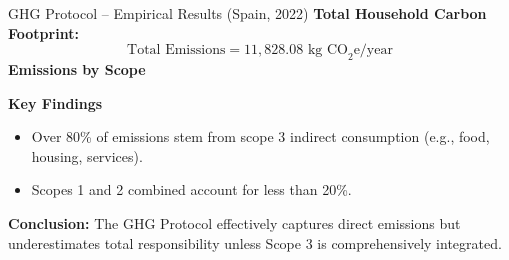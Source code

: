 \documentclass{beamer}
\begin{document}
\begin{frame}{GHG Protocol – Empirical Results (Spain, 2022)}
\vspace{-2.0em}
\footnotesize
\textbf{Total Household Carbon Footprint:}  
\[
\text{Total Emissions} = 11,828.08 \text{ kg CO}_2\text{e/year}
\]
\pause
\vspace{0.5em}
\textbf{Emissions by Scope}
\begin{table}[h!]
\small
\centering
\end{table}
\pause
\footnotesize
\textbf{Key Findings}
\begin{itemize}
  \item Over 80\% of emissions stem from scope 3 indirect consumption (e.g., food, housing, services).
  \item Scopes 1 and 2 combined account for less than 20\%.
\end{itemize}

\pause
\vspace{0.5em}
\textbf{Conclusion:}  
The GHG Protocol effectively captures direct emissions but underestimates total responsibility unless Scope 3 is comprehensively integrated.

\end{frame}
\end{document}
